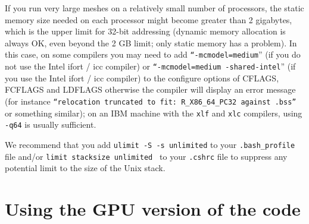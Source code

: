 If you run very large meshes on a relatively small number
of processors, the static memory size needed on each processor might become
greater than 2 gigabytes, which is the upper limit for 32-bit addressing
(dynamic memory allocation is always OK, even beyond the 2 GB limit; only static memory has a problem).
In this case, on some compilers you may need to add \texttt{``-mcmodel=medium}'' (if you do not use the Intel ifort / icc compiler)
or \texttt{``-mcmodel=medium -shared-intel}'' (if you use the Intel ifort / icc compiler)
to the configure options of CFLAGS, FCFLAGS and LDFLAGS otherwise the compiler will display an error
message (for instance \texttt{``relocation truncated to fit: R\_X86\_64\_PC32 against .bss''} or something similar);
on an IBM machine with the \texttt{xlf} and \texttt{xlc} compilers, using \texttt{-q64} is usually sufficient.\newline


We recommend that you add {\texttt{ulimit -S -s unlimited}} to your {\texttt{.bash\_profile}} file and/or {\texttt{limit stacksize unlimited }} to your {\texttt{.cshrc}} file to suppress any potential limit to the size of the Unix stack.\newline


\section{Using the GPU version of the code}

